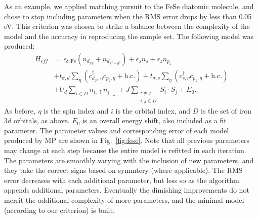 As an example, we applied matching pursuit to the FeSe diatomic molecule, and chose to stop including parameters when the RMS error drops by less than 0.05 eV.
This criterion was chosen to strike a balance between the complexity of the model and the accuracy in reproducing the sample set.
The following model was produced:
\begin{align}
  H_{eff}
  &=
  \epsilon_{\delta,\mathrm{Fe}} (n_{d_{xy}} + n_{d_{x^2-y^2}})
  +
  \epsilon_s n_{s}
  +
  \epsilon_{z} n_{p_z}
  \nonumber \\
  &+ 
  t_{\sigma,d} \sum_{\eta} \left( c_{d_{z^2},\eta}^{\dagger} c_{p_z,\eta} + \text{h.c.} \right)
  +
  t_{\sigma,s} \sum_{\eta} \left(c_{s,\eta}^{\dagger}  c_{p_z,\eta} + \text{h.c.} \right)
  \nonumber \\
  &+
  U_d \sum_{i \in D} n_{i,\uparrow} n_{i,\downarrow} 
  +
  J \sum_{\substack{i\ne j \\i,j \in D}} S_i \cdot S_j
  +
  E_0. \label{eq:fesemodel}
\end{align}
As before, $\eta$ is the spin index and $i$ is the orbital index, and $D$ is the set of iron $3d$ orbitals, as above.
$E_0$ is an overall energy shift, also included as a fit parameter.
The parameter values and corresponding error of each model produced by MP are shown in Fig.~\ref{fig:fese}.
Note that all previous parameters may change at each step because the entire model is refitted in each iteration.
The parameters are smoothly varying with the inclusion of new parameters, and they take the correct signs based on symmtery (where applicable). 
The RMS error decreases with each additional parameter, but less so as the algorithm appends additional parameters. 
Eventually the dimishing improvements do not merrit the additional complexity of more parameters, and the minimal model (according to our criterion) is built.


